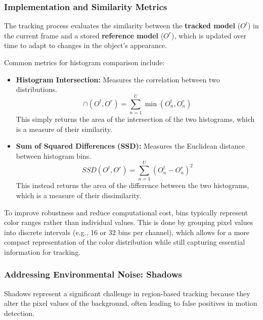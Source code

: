 \subsubsection{Implementation and Similarity Metrics}
The tracking process evaluates the similarity between the \textbf{tracked model} ($O^t$) 
in the current frame and a stored \textbf{reference model} ($O^r$), which is updated over time to adapt to changes in the object's appearance.

Common metrics for histogram comparison include:
\begin{itemize}
    \item \textbf{Histogram Intersection:} Measures the correlation between two distributions.
    $$\cap (O^t, O^r) = \sum_{n=1}^{U} \min(O^t_{n}, O^r_{n})$$
    This simply returns the area of the intersection of the two histograms, which is a measure of their similarity.
    \item \textbf{Sum of Squared Differences (SSD):} Measures the Euclidean distance between histogram bins.
    $$SSD(O^t, O^r) = \sum_{n=1}^{U} (O^t_{n} - O^r_{n})^2$$
    This instead returns the area of the difference between the two histograms, which is a measure of their dissimilarity.
\end{itemize}

\begin{center}
    \begin{minipage}{0.48\textwidth}
        \centering
        \resizebox{\linewidth}{!}{}
    \end{minipage}
    \hfill
    \begin{minipage}{0.48\textwidth}
        \centering
        \resizebox{\linewidth}{!}{}
    \end{minipage}
\end{center}

To improve robustness and reduce computational cost, bins typically represent color ranges rather than individual 
values. This is done by grouping pixel values into discrete intervals (e.g., 16 or 32 bins per channel), which allows 
for a more compact representation of the color distribution while still capturing essential information for tracking.

\subsubsection{Addressing Environmental Noise: Shadows}
Shadows represent a significant challenge in region-based tracking because 
they alter the pixel values of the background, often leading to false positives in motion detection. 

